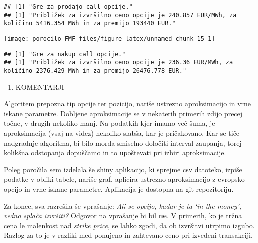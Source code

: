 \documentclass[
]{article}
\providecommand{\tightlist}{%
  \setlength{\itemsep}{0pt}\setlength{\parskip}{0pt}}
\begin{document}
\begin{verbatim}
## [1] "Gre za prodajo call opcije."
## [1] "Približek za izvršilno ceno opcije je 240.857 EUR/MWh, za količino 5416.354 MWh in za premijo 193440 EUR."
\end{verbatim}

\begin{center}\texttt{[image: porocilo\_FMF\_files/figure-latex/unnamed-chunk-15-1]} \end{center}

\begin{verbatim}
## [1] "Gre za nakup call opcije."
## [1] "Približek za izvršilno ceno opcije je 236.36 EUR/MWh, za količino 2376.429 MWh in za premijo 26476.778 EUR."
\end{verbatim}

\begin{enumerate}
\def\labelenumi{\arabic{enumi}.}
\setcounter{enumi}{3}
\tightlist
\item
  KOMENTARJI
\end{enumerate}

Algoritem prepozna tip opcije ter pozicijo, nariše ustrezno
aproksimacijo in vrne iskane parametre. Dobljene aproksimacije se v
nekaterih primerih zdijo precej točne, v drugih nekoliko manj. Na
podatkih kjer imamo več šuma, je aproksimacija (vsaj na videz) nekoliko
slabša, kar je pričakovano. Kar se tiče nadgradnje algoritma, bi bilo
morda smiselno določiti interval zaupanja, torej kolikšna odstopanja
dopuščamo in to upoštevati pri izbiri aproksimacije.

Poleg poročila sem izdelala še shiny aplikacijo, ki sprejme csv
datoteko, izpiše podatke v obliki tabele, nariše graf, aplicira ustrezno
aproksimacijo z evropsko opcijo in vrne iskane parametre. Aplikacija je
dostopna na git repozitoriju.

Za konec, sva razrešila še vprašanje: \emph{Ali se opcijo, kadar je ta
`in the money', vedno splača izvršiti?} Odgovor na vprašanje bi bil
\textbf{ne}. V primerih, ko je tržna cena le malenkost nad \emph{strike
price}, se lahko zgodi, da ob izvršitvi utrpimo izgubo. Razlog za to je
v razliki med ponujeno in zahtevano ceno pri izvedeni transakciji.
\end{document}
